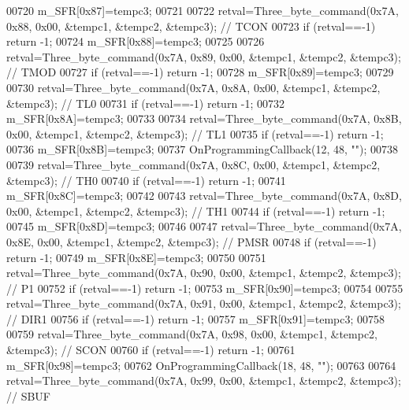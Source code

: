 \begin{DoxyCode}
{{{{{{{{{{{{{{{00720     m_SFR[0x87]=tempc3;
00721 
00722     retval=Three_byte_command(0x7A, 0x88, 0x00, &tempc1, &tempc2, &tempc3); \textcolor{comment}{// TCON}
00723     \textcolor{keywordflow}{if} (retval==-1) \textcolor{keywordflow}{return} -1;
00724     m_SFR[0x88]=tempc3;
00725 
00726     retval=Three_byte_command(0x7A, 0x89, 0x00, &tempc1, &tempc2, &tempc3); \textcolor{comment}{// TMOD}
00727     \textcolor{keywordflow}{if} (retval==-1) \textcolor{keywordflow}{return} -1;
00728     m_SFR[0x89]=tempc3;
00729 
00730     retval=Three_byte_command(0x7A, 0x8A, 0x00, &tempc1, &tempc2, &tempc3); \textcolor{comment}{// TL0}
00731     \textcolor{keywordflow}{if} (retval==-1) \textcolor{keywordflow}{return} -1;
00732     m_SFR[0x8A]=tempc3;
00733 
00734     retval=Three_byte_command(0x7A, 0x8B, 0x00, &tempc1, &tempc2, &tempc3); \textcolor{comment}{// TL1}
00735     \textcolor{keywordflow}{if} (retval==-1) \textcolor{keywordflow}{return} -1;
00736     m_SFR[0x8B]=tempc3;
00737         OnProgrammingCallback(12, 48, \textcolor{stringliteral}{""});
00738 
00739     retval=Three_byte_command(0x7A, 0x8C, 0x00, &tempc1, &tempc2, &tempc3); \textcolor{comment}{// TH0}
00740     \textcolor{keywordflow}{if} (retval==-1) \textcolor{keywordflow}{return} -1;
00741     m_SFR[0x8C]=tempc3;
00742 
00743     retval=Three_byte_command(0x7A, 0x8D, 0x00, &tempc1, &tempc2, &tempc3); \textcolor{comment}{// TH1}
00744     \textcolor{keywordflow}{if} (retval==-1) \textcolor{keywordflow}{return} -1;
00745         m_SFR[0x8D]=tempc3;
00746 
00747     retval=Three_byte_command(0x7A, 0x8E, 0x00, &tempc1, &tempc2, &tempc3); \textcolor{comment}{// PMSR}
00748     \textcolor{keywordflow}{if} (retval==-1) \textcolor{keywordflow}{return} -1;
00749     m_SFR[0x8E]=tempc3;
00750 
00751     retval=Three_byte_command(0x7A, 0x90, 0x00, &tempc1, &tempc2, &tempc3); \textcolor{comment}{// P1}
00752     \textcolor{keywordflow}{if} (retval==-1) \textcolor{keywordflow}{return} -1;
00753     m_SFR[0x90]=tempc3;
00754 
00755     retval=Three_byte_command(0x7A, 0x91, 0x00, &tempc1, &tempc2, &tempc3); \textcolor{comment}{// DIR1}
00756     \textcolor{keywordflow}{if} (retval==-1) \textcolor{keywordflow}{return} -1;
00757     m_SFR[0x91]=tempc3;
00758 
00759     retval=Three_byte_command(0x7A, 0x98, 0x00, &tempc1, &tempc2, &tempc3); \textcolor{comment}{// SCON}
00760     \textcolor{keywordflow}{if} (retval==-1) \textcolor{keywordflow}{return} -1;
00761     m_SFR[0x98]=tempc3;
00762         OnProgrammingCallback(18, 48, \textcolor{stringliteral}{""});
00763 
00764     retval=Three_byte_command(0x7A, 0x99, 0x00, &tempc1, &tempc2, &tempc3); \textcolor{comment}{// SBUF}
}}}}}}}}}}}}}}}
\end{DoxyCode}
